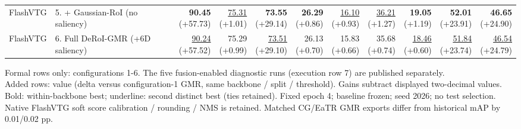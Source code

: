 \documentclass{article}
\begin{document}
{\begin{tabular}{llrrrrrrrrr}
FlashVTG & 5. + Gaussian-RoI (no saliency) & \shortstack{\textbf{90.45} \\ {\scriptsize (+57.73)}} & \shortstack{\underline{75.31} \\ {\scriptsize (+1.01)}} & \shortstack{\textbf{73.55} \\ {\scriptsize (+29.14)}} & \shortstack{\textbf{26.29} \\ {\scriptsize (+0.86)}} & \shortstack{\underline{16.10} \\ {\scriptsize (+0.93)}} & \shortstack{\underline{36.21} \\ {\scriptsize (+1.27)}} & \shortstack{\textbf{19.05} \\ {\scriptsize (+1.19)}} & \shortstack{\textbf{52.01} \\ {\scriptsize (+23.91)}} & \shortstack{\textbf{46.65} \\ {\scriptsize (+24.90)}} \\
FlashVTG & 6. Full DeRoI-GMR (+6D saliency) & \shortstack{\underline{90.24} \\ {\scriptsize (+57.52)}} & \shortstack{75.29 \\ {\scriptsize (+0.99)}} & \shortstack{\underline{73.51} \\ {\scriptsize (+29.10)}} & \shortstack{26.13 \\ {\scriptsize (+0.70)}} & \shortstack{15.83 \\ {\scriptsize (+0.66)}} & \shortstack{35.68 \\ {\scriptsize (+0.74)}} & \shortstack{\underline{18.46} \\ {\scriptsize (+0.60)}} & \shortstack{\underline{51.84} \\ {\scriptsize (+23.74)}} & \shortstack{\underline{46.54} \\ {\scriptsize (+24.79)}} \\
\bottomrule\end{tabular}}\par\medskip\footnotesize
Formal rows only: configurations 1-6. The five fusion-enabled diagnostic runs (execution row 7) are published separately.\\Added rows: value (delta versus configuration-1 GMR, same backbone / split / threshold). Gains subtract displayed two-decimal values.\\Bold: within-backbone best; underline: second distinct best (ties retained). Fixed epoch 4; baseline frozen; seed 2026; no test selection.\\Native FlashVTG soft score calibration / rounding / NMS is retained. Matched CG/EaTR GMR exports differ from historical mAP by 0.01/0.02 pp.
\end{document}
